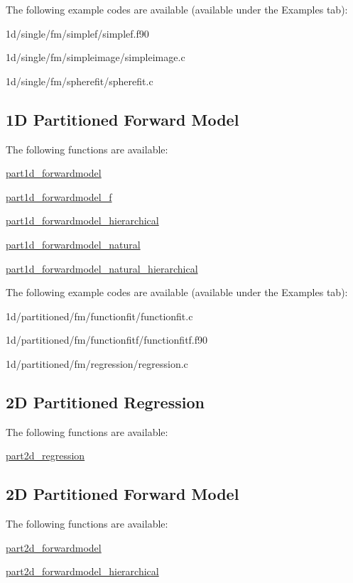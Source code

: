 The following example codes are available (available under the Examples tab)\+:


\begin{DoxyItemize}
\item 1d/single/fm/simplef/simplef.\+f90
\item 1d/single/fm/simpleimage/simpleimage.\+c
\item 1d/single/fm/spherefit/spherefit.\+c
\end{DoxyItemize}\hypertarget{index_partfm1d}{}\subsection{1\+D Partitioned Forward Model}\label{index_partfm1d}
The following functions are available\+:


\begin{DoxyItemize}
\item \hyperlink{forwardmodel_8h_a852beb6cfb6875927200fa90d6d60d6e}{part1d\+\_\+forwardmodel}
\item \hyperlink{forwardmodel__f_8h_aa7d79eacccaac4d0770cd207b166dced}{part1d\+\_\+forwardmodel\+\_\+f}
\item \hyperlink{forwardmodel_8h_a267826c400d1ae8be3473c4bdc03e05b}{part1d\+\_\+forwardmodel\+\_\+hierarchical}
\item \hyperlink{forwardmodel_8h_a736c12ab94ec4dd7e785baa8b028c6e6}{part1d\+\_\+forwardmodel\+\_\+natural}
\item \hyperlink{forwardmodel_8h_ad6b46c9104fbbea5c119bc64e8f29190}{part1d\+\_\+forwardmodel\+\_\+natural\+\_\+hierarchical}
\end{DoxyItemize}

The following example codes are available (available under the Examples tab)\+:


\begin{DoxyItemize}
\item 1d/partitioned/fm/functionfit/functionfit.\+c
\item 1d/partitioned/fm/functionfitf/functionfitf.\+f90
\item 1d/partitioned/fm/regression/regression.\+c
\end{DoxyItemize}\hypertarget{index_partregress2d}{}\subsection{2\+D Partitioned Regression}\label{index_partregress2d}
The following functions are available\+:


\begin{DoxyItemize}
\item \hyperlink{regression_8h_aa4589a0fbb1ca56b2db6fafbda40161f}{part2d\+\_\+regression}
\end{DoxyItemize}\hypertarget{index_partfm2d}{}\subsection{2\+D Partitioned Forward Model}\label{index_partfm2d}
The following functions are available\+:


\begin{DoxyItemize}
\item \hyperlink{forwardmodel_8h_a1a30e27827e21f0906d74634c611cc54}{part2d\+\_\+forwardmodel}
\item \hyperlink{forwardmodel_8h_a7f812853c942aeb44dd57ce2823a8523}{part2d\+\_\+forwardmodel\+\_\+hierarchical} 
\end{DoxyItemize}